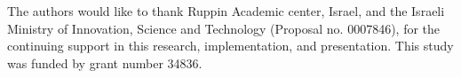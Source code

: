 
The authors would like to thank Ruppin Academic center, Israel, and the Israeli Ministry of Innovation, Science and Technology (Proposal no. 0007846), for the continuing support in this research, implementation, and presentation. This study was funded by grant number 34836.
